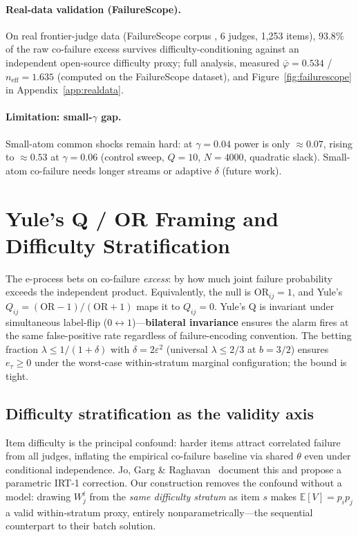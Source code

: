 \documentclass{article}
\begin{document}
\paragraph{Real-data validation (FailureScope).}
On real frontier-judge data (FailureScope corpus \citep{saban2606,failurescope_data}, 6 judges, 1{,}253
items), $93.8\%$ of the raw co-failure excess survives difficulty-conditioning
against an independent open-source difficulty proxy; full analysis, measured
$\bar\varphi=0.534$ / $n_{\mathrm{eff}}=1.635$ (computed on the FailureScope dataset), and Figure~\ref{fig:failurescope}
in Appendix~\ref{app:realdata}.

\paragraph{Limitation: small-$\gamma$ gap.}
\label{sec:gammalimit}
Small-atom common shocks remain hard: at $\gamma=0.04$ power is only
$\approx 0.07$, rising to $\approx 0.53$ at $\gamma=0.06$ (control sweep,
$Q=10$, $N=4000$, quadratic slack). Small-atom co-failure needs longer streams
or adaptive $\delta$ (future work).

\section{Yule's Q / OR Framing and Difficulty Stratification}
\label{sec:or}

The e-process bets on co-failure \emph{excess}: by how much joint failure
probability exceeds the independent product. Equivalently, the null is
$\mathrm{OR}_{ij}=1$, and Yule's $Q_{ij}=(\mathrm{OR}-1)/(\mathrm{OR}+1)$
maps it to $Q_{ij}=0$. Yule's Q is invariant under simultaneous label-flip
($0\leftrightarrow1$)---\textbf{bilateral invariance} ensures the alarm fires at the
same false-positive rate regardless of failure-encoding convention. The betting
fraction $\lambda\le1/(1+\delta)$ with $\delta=2\varepsilon^2$ (universal
$\lambda\le 2/3$ at $b=3/2$) ensures $e_\tau\ge0$ under the worst-case
within-stratum marginal configuration; the bound is tight.

\subsection{Difficulty stratification as the validity axis}
\label{sec:strat}

Item difficulty is the principal confound: harder items attract correlated failure
from all judges, inflating the empirical co-failure baseline via shared $\theta$
even under conditional independence. Jo, Garg \& Raghavan~\citep{jo2602} document
this and propose a parametric IRT-1 correction. Our construction removes the
confound without a model: drawing $W_j^t$ from the \emph{same difficulty stratum}
as item $s$ makes $\mathbb{E}[V]=p_ip_j$ a valid within-stratum proxy,
entirely nonparametrically---the sequential counterpart to their batch solution.
\end{document}
